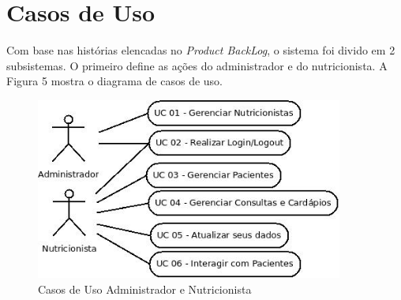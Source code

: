 \documentclass[
	12pt,				%
    oneside,			%
	a4paper,			%
	english,			%
	french,				%
	spanish,			%
	brazil,				%
	]{abntex2}
\begin{document}
\section{Casos de Uso}

Com base nas histórias elencadas no \textit{Product BackLog}, o sistema foi divido em 2
subsistemas. O primeiro define as ações do administrador e do nutricionista. A Figura 5
mostra o diagrama de casos de uso.

\begin{figure} [hbt] 
\begin{center}
\includegraphics[width=0.9\textwidth]{uc1.jpeg}
\end{center}
\label{uc1} 
\caption{Casos de Uso Administrador e Nutricionista}
\end{figure}
\end{document}
